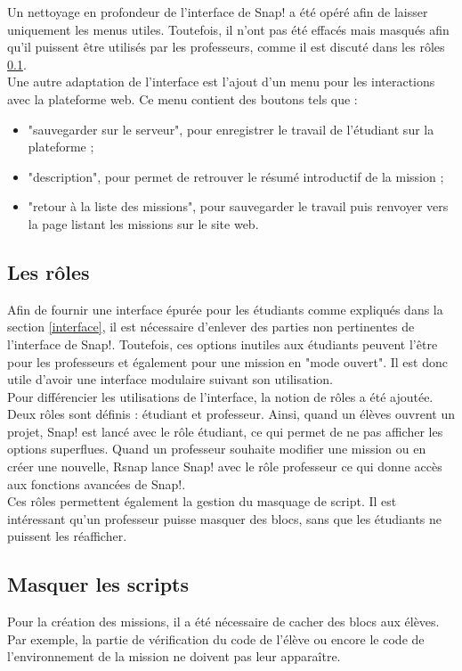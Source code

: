 Un nettoyage en profondeur de l'interface de Snap! a été opéré afin de laisser uniquement les menus utiles. Toutefois, il n'ont pas été effacés mais masqués afin qu'il puissent être utilisés par les professeurs, comme il est discuté dans les rôles \ref{role}.\\

Une autre adaptation de l'interface est l'ajout d'un menu pour les interactions avec la plateforme web. Ce menu contient des boutons tels que : 
\begin{itemize}
  \item "sauvegarder sur le serveur", pour enregistrer le travail de l'étudiant sur la plateforme ; 
  \item "description", pour permet de retrouver le résumé introductif de la mission ; 
  \item "retour à la liste des missions", pour sauvegarder le travail puis renvoyer vers la page listant les missions sur le site web.
\end{itemize}

\subsection{Les rôles}
\label{role}
Afin de fournir une interface épurée pour les étudiants comme expliqués dans la section \ref{interface}, il est nécessaire d'enlever des parties non pertinentes de l'interface de Snap!. Toutefois, ces options inutiles aux étudiants peuvent l'être pour les professeurs et également pour une mission en "mode ouvert". Il est donc utile d'avoir une interface modulaire suivant son utilisation. \\

Pour différencier les utilisations de l'interface, la notion de rôles a été ajoutée. Deux rôles sont définis : étudiant et professeur. Ainsi, quand un élèves ouvrent un projet, Snap! est lancé avec le rôle étudiant, ce qui permet de ne pas afficher les options superflues. Quand un professeur souhaite modifier une mission ou en créer une nouvelle, Rsnap lance Snap! avec le rôle professeur ce qui donne accès aux fonctions avancées de Snap!.\\

Ces rôles permettent également la gestion du masquage de script. Il est intéressant qu'un professeur puisse masquer des blocs, sans que les étudiants ne puissent les réafficher.

\subsection{Masquer les scripts}
Pour la création des missions, il a été nécessaire de cacher des blocs aux élèves. Par exemple, la partie de vérification du code de l'élève ou encore le code de l'environnement de la mission ne doivent pas leur apparaître. 

